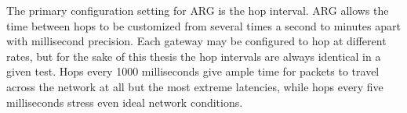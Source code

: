 \par The primary configuration setting for \ac{ARG} is the hop interval. \ac{ARG} allows the time between hops to be customized from several times a second to minutes apart with millisecond precision. Each gateway may be configured to hop at different rates, but for the sake of this thesis the hop intervals are always identical in a given test. Hops every 1000 milliseconds give ample time for packets to travel across the network at all but the most extreme latencies, while hops every five milliseconds stress even ideal network conditions.

\begin{comment}
\section{Factors}
\FloatBarrier
\label{sec:factors}
\par Based on the system and workload parameters given above, the following factors are varied as part of the experiment. All others remain constant throughout the experiment. Factors and levels are summarized in Table \ref{tbl:factors} and described in detail below.

\begin{table}
\begin{center}
	\caption{Experimental factors and levels}
	\label{tbl:factors}
	
	\begin{tabular}{r|l}
	\textbf{Factor} & \textbf{Possible Levels} \\
	\hline
	Hop interval (ms) & 1000, 500, 300, 200, 100, 75, 60, 50, 40, 30, 15, 10, 5\\
	Round-trip latency (ms) & 500, 100, 30, 20, 0\\
	Packet delay (s) & 0.3, 0.2, 0.1, 0.05, 0.01, 0.005, 0.001\\
	Traffic direction and type & See detailed description
	\end{tabular}
\end{center}
\end{table}

\begin{itemize}
\item Hop interval 
	\par Varying the rate at which \ac{ARG} switches to a new external \ac{IP} allows testing of the shortest supportable hop interval. Hops every 1000 milliseconds give ample time for packets to travel across the network at all but the most extreme latencies, while hops every 5 milliseconds stress even ideal network conditions.


\end{comment}
